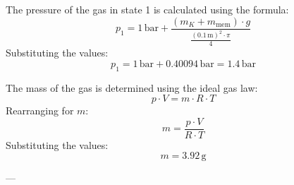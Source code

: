 The pressure of the gas in state 1 is calculated using the formula:  
\[
p_1 = 1 \, \text{bar} + \frac{(m_K + m_{\text{mem}}) \cdot g}{\frac{(0.1 \, \text{m})^2 \cdot \pi}{4}}
\]  
Substituting the values:  
\[
p_1 = 1 \, \text{bar} + 0.40094 \, \text{bar} = 1.4 \, \text{bar}
\]  

The mass of the gas is determined using the ideal gas law:  
\[
p \cdot V = m \cdot R \cdot T
\]  
Rearranging for \( m \):  
\[
m = \frac{p \cdot V}{R \cdot T}
\]  
Substituting the values:  
\[
m = 3.92 \, \text{g}
\]  

---